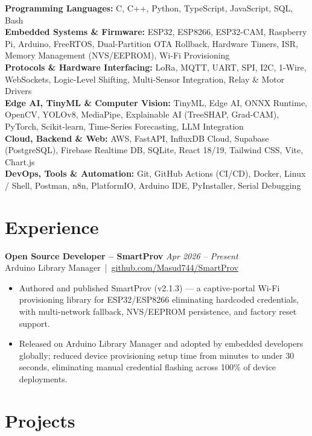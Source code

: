 \documentclass[11pt,a4paper]{article}
\begin{document}
\textbf{Programming Languages:} C, C++, Python, TypeScript, JavaScript, SQL, Bash \\
\textbf{Embedded Systems \& Firmware:} ESP32, ESP8266, ESP32-CAM, Raspberry Pi, Arduino, FreeRTOS, Dual-Partition OTA Rollback, Hardware Timers, ISR, Memory Management (NVS/EEPROM), Wi-Fi Provisioning \\
\textbf{Protocols \& Hardware Interfacing:} LoRa, MQTT, UART, SPI, I2C, 1-Wire, WebSockets, Logic-Level Shifting, Multi-Sensor Integration, Relay \& Motor Drivers \\
\textbf{Edge AI, TinyML \& Computer Vision:} TinyML, Edge AI, ONNX Runtime, OpenCV, YOLOv8, MediaPipe, Explainable AI (TreeSHAP, Grad-CAM), PyTorch, Scikit-learn, Time-Series Forecasting, LLM Integration \\
\textbf{Cloud, Backend \& Web:} AWS, FastAPI, InfluxDB Cloud, Supabase (PostgreSQL), Firebase Realtime DB, SQLite, React 18/19, Tailwind CSS, Vite, Chart.js \\
\textbf{DevOps, Tools \& Automation:} Git, GitHub Actions (CI/CD), Docker, Linux / Shell, Postman, n8n, PlatformIO, Arduino IDE, PyInstaller, Serial Debugging

\section*{Experience}

\textbf{Open Source Developer -- SmartProv} \hfill \textit{Apr 2026 -- Present} \\
Arduino Library Manager \,|\,
\href{https://github.com/Masud744/SmartProv}{github.com/Masud744/SmartProv}
\begin{itemize}
    \item Authored and published SmartProv (v2.1.3) --- a captive-portal Wi-Fi provisioning
          library for ESP32/ESP8266 eliminating hardcoded credentials, with
          multi-network fallback, NVS/EEPROM persistence, and factory reset support.
    \item Released on Arduino Library Manager and adopted by embedded developers globally;
          reduced device provisioning setup time from minutes to under 30 seconds,
          eliminating manual credential flashing across 100\% of device deployments.
\end{itemize}


\section*{Projects}
\end{document}
